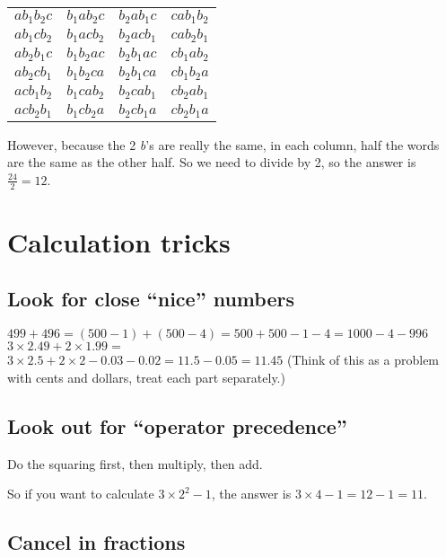 \documentclass[fullpage,twocolumn]{article}
\begin{document}
\begin{tabular}{llll}
$a b_1 b_2 c $  & $ b_1 a b_2 c $ & $b_2 a b_1 c  $ & $c a b_1 b_2 $  \\
$a b_1 c b_2 $  & $ b_1 a c b_2 $ & $b_2 a c b_1  $ & $c a b_2 b_1 $  \\
$a b_2 b_1 c $  & $ b_1 b_2 a c $ & $b_2 b_1 a c  $ & $c b_1 a b_2 $  \\
$a b_2 c b_1 $  & $ b_1 b_2 c a $ & $b_2 b_1 c a  $ & $c b_1 b_2 a $  \\
$a c b_1 b_2 $  & $ b_1 c a b_2 $ & $b_2 c a b_1  $ & $c b_2 a b_1 $  \\
$a c b_2 b_1 $  & $ b_1 c b_2 a $ & $b_2 c b_1 a  $ & $c b_2 b_1 a $  \\
\end{tabular}

However, because the 2 {\em b}'s are really the same, in each
column, half the words are the same as the other half. So we need 
to divide by 2, so the answer is $\frac{24}{2} = 12$.

\section{Calculation tricks}

\subsection{Look for close ``nice'' numbers}
$499 + 496 = (500 - 1) + (500 - 4 ) = 500 + 500 - 1 - 4 = 1000 - 4 - 996$\\

$3 \times 2.49 + 2 \times 1.99 =$ \\
$ 3 \times 2.5 + 2 \times 2 - 0.03 - 0.02 = 11.5 - 0.05 = 11.45$
(Think of this as a problem with cents and dollars, treat each part separately.)

\subsection{Look out for ``operator precedence''}

Do the squaring first, then multiply, then add.  

So if you want to calculate $3 \times 2^2 - 1$, 
the answer is $3\times  4 -  1 = 12 - 1 = 11$.

\subsection{Cancel in fractions}
\end{document}
